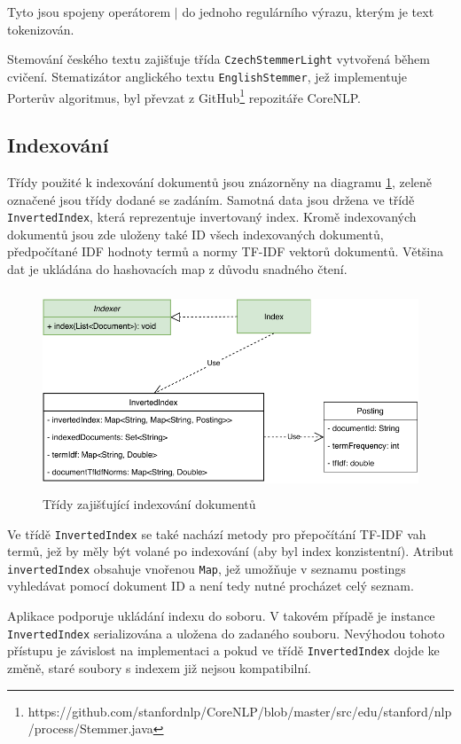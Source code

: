 \documentclass[11pt,a4paper]{scrartcl}
\begin{document}
	Tyto jsou spojeny operátorem $|$ do jednoho regulárního výrazu, kterým je text tokenizován.
	
	Stemování českého textu zajišťuje třída \verb|CzechStemmerLight| vytvořená během cvičení. Stematizátor anglického textu \verb|EnglishStemmer|, jež implementuje Porterův algoritmus, byl převzat z GitHub\footnote{https://github.com/stanfordnlp/CoreNLP/blob/master/src/edu/stanford/nlp/process/Stemmer.java} repozitáře CoreNLP.
	
	
	\subsection{Indexování}
	
	Třídy použité k indexování dokumentů jsou znázorněny na diagramu \ref{fig:index-uml}, zeleně označené jsou třídy dodané se zadáním. Samotná data jsou držena ve třídě \verb|InvertedIndex|, která reprezentuje invertovaný index. Kromě indexovaných dokumentů jsou zde uloženy také ID všech indexovaných dokumentů, předpočítané IDF hodnoty termů a normy TF-IDF vektorů dokumentů. 	Většina dat je ukládána do hashovacích map z důvodu snadného čtení.  
	
	\begin{figure}[!h]
		\centering
		\includegraphics[height=6cm]{index-uml}
		\caption{Třídy zajišťující indexování dokumentů}
		\label{fig:index-uml}
	\end{figure} 

	Ve třídě \verb|InvertedIndex| se také nachází metody pro přepočítání TF-IDF vah termů, jež by měly být volané po indexování (aby byl index konzistentní). Atribut \verb|invertedIndex| obsahuje vnořenou \verb|Map|, jež umožňuje v seznamu postings vyhledávat pomocí dokument ID a není tedy nutné procházet celý seznam. 
	
	Aplikace podporuje ukládání indexu do soboru. V takovém případě je instance \verb|InvertedIndex| serializována a uložena do zadaného souboru. Nevýhodou tohoto přístupu je závislost na implementaci a pokud ve třídě \verb|InvertedIndex|  dojde ke změně, staré soubory s indexem již nejsou kompatibilní.
	
\end{document}
